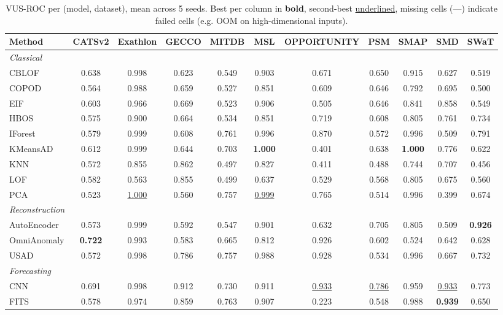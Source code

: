 \begin{table}[t]
\centering
\small
\caption{VUS-ROC per (model, dataset), mean across 5 seeds. Best per column in \textbf{bold}, second-best \underline{underlined}, missing cells (---) indicate failed cells (e.g. OOM on high-dimensional inputs).}
\label{tab:by-dataset-vus-roc}
\begin{tabular}{lcccccccccc}
\toprule
Method & CATSv2 & Exathlon & GECCO & MITDB & MSL & OPPORTUNITY & PSM & SMAP & SMD & SWaT \\
\midrule
\multicolumn{11}{l}{\textit{Classical}} \\
CBLOF & 0.638 & 0.998 & 0.623 & 0.549 & 0.903 & 0.671 & 0.650 & 0.915 & 0.627 & 0.519 \\
COPOD & 0.564 & 0.988 & 0.659 & 0.527 & 0.851 & 0.609 & 0.646 & 0.792 & 0.695 & 0.500 \\
EIF & 0.603 & 0.966 & 0.669 & 0.523 & 0.906 & 0.505 & 0.646 & 0.841 & 0.858 & 0.549 \\
HBOS & 0.575 & 0.900 & 0.664 & 0.534 & 0.851 & 0.719 & 0.608 & 0.805 & 0.761 & 0.734 \\
IForest & 0.579 & 0.999 & 0.608 & 0.761 & 0.996 & 0.870 & 0.572 & 0.996 & 0.509 & 0.791 \\
KMeansAD & 0.612 & 0.999 & 0.644 & 0.703 & \textbf{1.000} & 0.401 & 0.638 & \textbf{1.000} & 0.776 & 0.622 \\
KNN & 0.572 & 0.855 & 0.862 & 0.497 & 0.827 & 0.411 & 0.488 & 0.744 & 0.707 & 0.456 \\
LOF & 0.582 & 0.563 & 0.855 & 0.499 & 0.637 & 0.529 & 0.568 & 0.805 & 0.675 & 0.560 \\
PCA & 0.523 & \underline{1.000} & 0.560 & 0.757 & \underline{0.999} & 0.765 & 0.514 & 0.996 & 0.399 & 0.674 \\
\midrule
\multicolumn{11}{l}{\textit{Reconstruction}} \\
AutoEncoder & 0.573 & 0.999 & 0.592 & 0.547 & 0.901 & 0.632 & 0.705 & 0.805 & 0.509 & \textbf{0.926} \\
OmniAnomaly & \textbf{0.722} & 0.993 & 0.583 & 0.665 & 0.812 & 0.926 & 0.602 & 0.524 & 0.642 & 0.628 \\
USAD & 0.572 & 0.998 & 0.786 & 0.757 & 0.988 & 0.928 & 0.534 & 0.996 & 0.667 & 0.732 \\
\midrule
\multicolumn{11}{l}{\textit{Forecasting}} \\
CNN & 0.691 & 0.998 & 0.912 & 0.730 & 0.911 & \underline{0.933} & \underline{0.786} & 0.959 & \underline{0.933} & 0.773 \\
FITS & 0.578 & 0.974 & 0.859 & 0.763 & 0.907 & 0.223 & 0.548 & 0.988 & \textbf{0.939} & 0.650 \\

\end{tabular}
\end{table}
